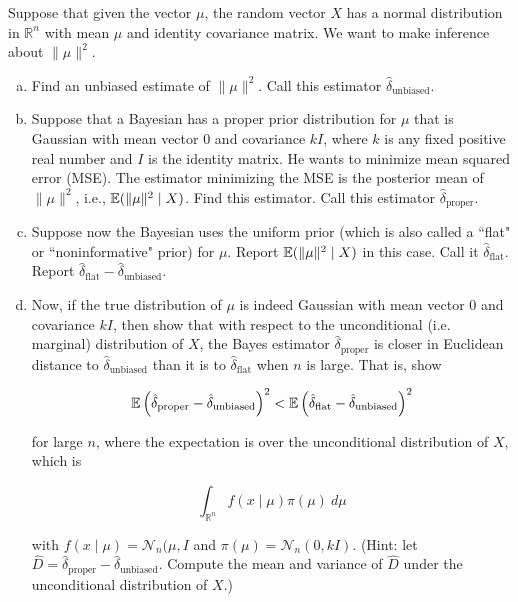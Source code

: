 \begin{exercise} 

Suppose that given the vector \(\mu\), the random vector \(X\) has a normal distribution in \(\mathbb{R}^n\) with mean \(\mu\) and identity covariance matrix. We want to make inference about \(\lVert \mu \rVert^2\).

\begin{enumerate}[(a)]

\item  Find an unbiased estimate of \(\lVert \mu \rVert^2\). Call this estimator \(\hat{\delta}_{\text{unbiased}}\).

\item Suppose that a Bayesian has a proper prior distribution for \(\mu\) that is Gaussian with mean vector 0 and covariance \(kI\), where \(k\) is any fixed positive real number and \(I\) is the identity matrix. He wants to minimize mean squared error (MSE). The estimator minimizing the MSE is the posterior mean of \(\lVert \mu \rVert^2\), i.e., \(\E ( \lVert \mu \rVert^2 \mid X)\). Find this estimator. Call this estimator \(\hat{\delta}_{\text{proper}}\).

\item Suppose now the Bayesian uses the uniform prior (which is also called a ``flat" or ``noninformative" prior) for \(\mu\). Report \(\E(\lVert \mu \rVert^2 \mid X)\) in this case. Call it \(\hat{\delta}_{\text{flat}}\). Report \(\hat{\delta}_{\text{flat}}- \hat{\delta}_{\text{unbiased}}\).

\item Now, if the true distribution of \(\mu\) is indeed Gaussian with mean vector 0 and covariance \(kI\), then show that with respect to the unconditional (i.e. marginal) distribution of \(X\), the Bayes estimator \(\hat{\delta}_{\text{proper}}\) is closer in Euclidean distance to \(\hat{\delta}_{\text{unbiased}}\) than it is to \(\hat{\delta}_{\text{flat}}\) when \(n\) is large. That is, show

\[
\E \left( \hat{\delta}_{\text{proper}} - \hat{\delta}_{\text{unbiased}}\right)^2 < \E \left( \hat{\delta}_{\text{flat}} - \hat{\delta}_{\text{unbiased}}\right)^2 
\]

for large \(n\), where the expectation is over the unconditional distribution of \(X\), which is

\[
\int_{\mathbb{R}^n} f(x \mid \mu) \pi(\mu) \ d \mu
\]

with \(f(x \mid \mu) = \mathcal{N}_n(\mu, I\) and \(\pi(\mu) = \mathcal{N}_n(0, kI)\). (Hint: let \(\hat{D} = \hat{\delta}_{\text{proper}} - \hat{\delta}_{\text{unbiased}}\). Compute the mean and variance of \(\hat{D}\) under the unconditional distribution of \(X\).)


\end{enumerate}

\end{exercise}

